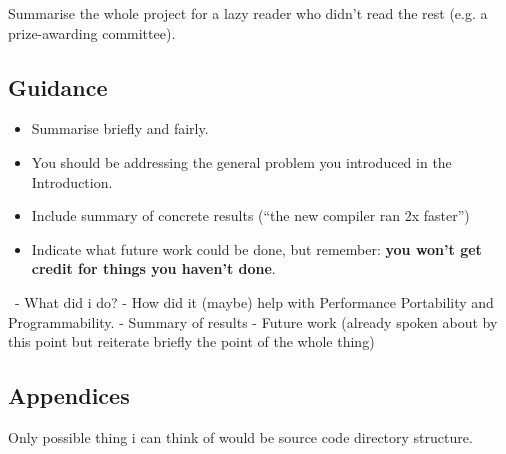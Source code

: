 \documentclass{l4proj}
\begin{document}
Summarise the whole project for a lazy reader who didn't read the rest (e.g. a prize-awarding committee).
\section{Guidance}
\begin{itemize}
    \item
        Summarise briefly and fairly.
    \item
        You should be addressing the general problem you introduced in the
        Introduction.        
    \item
        Include summary of concrete results (``the new compiler ran 2x
        faster'')
    \item
        Indicate what future work could be done, but remember: \textbf{you
        won't get credit for things you haven't done}.
\end{itemize}


\
 - What did i do?
 - How did it (maybe) help with Performance Portability and Programmability.
 - Summary of results
 - Future work (already spoken about by this point but reiterate briefly the point of the whole thing)





%
% 

\begin{appendices}

\chapter{Appendices}

Only possible thing i can think of would be source code directory structure.

\end{appendices}






\end{document}
